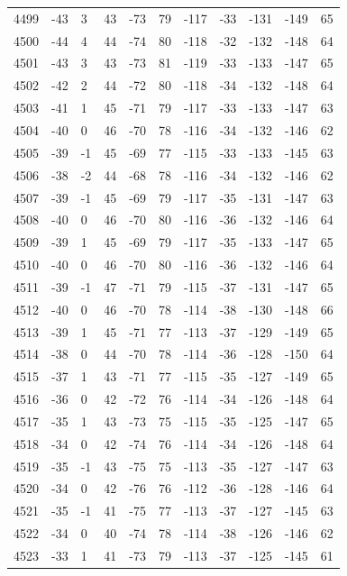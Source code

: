 \begin{table}[H]
\begin{tabular}{lllllllllll}
4499 & -43 & 3 & 43 & -73 & 79 & -117 & -33 & -131 & -149 & 65 \\
4500 & -44 & 4 & 44 & -74 & 80 & -118 & -32 & -132 & -148 & 64 \\
4501 & -43 & 3 & 43 & -73 & 81 & -119 & -33 & -133 & -147 & 65 \\
4502 & -42 & 2 & 44 & -72 & 80 & -118 & -34 & -132 & -148 & 64 \\
4503 & -41 & 1 & 45 & -71 & 79 & -117 & -33 & -133 & -147 & 63 \\
4504 & -40 & 0 & 46 & -70 & 78 & -116 & -34 & -132 & -146 & 62 \\
4505 & -39 & -1 & 45 & -69 & 77 & -115 & -33 & -133 & -145 & 63 \\
4506 & -38 & -2 & 44 & -68 & 78 & -116 & -34 & -132 & -146 & 62 \\
4507 & -39 & -1 & 45 & -69 & 79 & -117 & -35 & -131 & -147 & 63 \\
4508 & -40 & 0 & 46 & -70 & 80 & -116 & -36 & -132 & -146 & 64 \\
4509 & -39 & 1 & 45 & -69 & 79 & -117 & -35 & -133 & -147 & 65 \\
4510 & -40 & 0 & 46 & -70 & 80 & -116 & -36 & -132 & -146 & 64 \\
4511 & -39 & -1 & 47 & -71 & 79 & -115 & -37 & -131 & -147 & 65 \\
4512 & -40 & 0 & 46 & -70 & 78 & -114 & -38 & -130 & -148 & 66 \\
4513 & -39 & 1 & 45 & -71 & 77 & -113 & -37 & -129 & -149 & 65 \\
4514 & -38 & 0 & 44 & -70 & 78 & -114 & -36 & -128 & -150 & 64 \\
4515 & -37 & 1 & 43 & -71 & 77 & -115 & -35 & -127 & -149 & 65 \\
4516 & -36 & 0 & 42 & -72 & 76 & -114 & -34 & -126 & -148 & 64 \\
4517 & -35 & 1 & 43 & -73 & 75 & -115 & -35 & -125 & -147 & 65 \\
4518 & -34 & 0 & 42 & -74 & 76 & -114 & -34 & -126 & -148 & 64 \\
4519 & -35 & -1 & 43 & -75 & 75 & -113 & -35 & -127 & -147 & 63 \\
4520 & -34 & 0 & 42 & -76 & 76 & -112 & -36 & -128 & -146 & 64 \\
4521 & -35 & -1 & 41 & -75 & 77 & -113 & -37 & -127 & -145 & 63 \\
4522 & -34 & 0 & 40 & -74 & 78 & -114 & -38 & -126 & -146 & 62 \\
4523 & -33 & 1 & 41 & -73 & 79 & -113 & -37 & -125 & -145 & 61 \\

\end{tabular}
\end{table}
